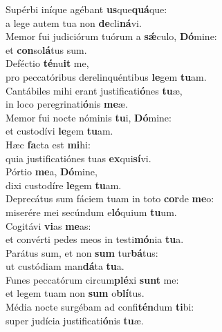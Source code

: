 \oddverse Supérbi iníque agébant \textbf{us}que\textbf{quá}que:~\*\\
\oddverse a lege autem tua non \textbf{de}cli\textbf{ná}vi.\\
\evenverse Memor fui judiciórum tuórum a \textbf{sǽ}culo, \textbf{Dó}mine:~\*\\
\evenverse et \textbf{con}so\textbf{lá}tus sum.\\
\oddverse Deféctio \textbf{té}nu\textbf{it} me,~\*\\
\oddverse pro peccatóribus derelinquéntibus \textbf{le}gem \textbf{tu}am.\\
\evenverse Cantábiles mihi erant justificati\textbf{ó}nes \textbf{tu}æ,~\*\\
\evenverse in loco peregrinati\textbf{ó}nis \textbf{me}æ.\\
\oddverse Memor fui nocte nóminis \textbf{tu}i, \textbf{Dó}mine:~\*\\
\oddverse et custodívi \textbf{le}gem \textbf{tu}am.\\
\evenverse Hæc \textbf{fa}cta est \textbf{mi}hi:~\*\\
\evenverse quia justificatiónes tuas \textbf{ex}qui\textbf{sí}vi.\\
\oddverse Pórtio \textbf{me}a, \textbf{Dó}mine,~\*\\
\oddverse dixi custodíre \textbf{le}gem \textbf{tu}am.\\
\evenverse Deprecátus sum fáciem tuam in toto \textbf{cor}de \textbf{me}o:~\*\\
\evenverse miserére mei secúndum e\textbf{ló}quium \textbf{tu}um.\\
\oddverse Cogitávi \textbf{vi}as \textbf{me}as:~\*\\
\oddverse et convérti pedes meos in testi\textbf{mó}nia \textbf{tu}a.\\
\evenverse Parátus sum, et non \textbf{sum} tur\textbf{bá}tus:~\*\\
\evenverse ut custódiam man\textbf{dá}ta \textbf{tu}a.\\
\oddverse Funes peccatórum circum\textbf{plé}xi \textbf{sunt} me:~\*\\
\oddverse et legem tuam non \textbf{sum} o\textbf{blí}tus.\\
\evenverse Média nocte surgébam ad confi\textbf{tén}dum \textbf{ti}bi:~\*\\
\evenverse super judícia justificati\textbf{ó}nis \textbf{tu}æ.\\
